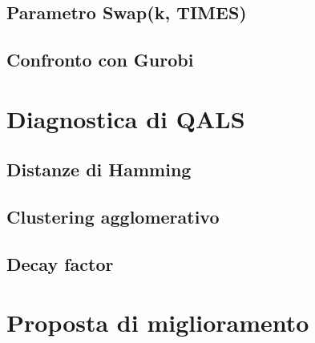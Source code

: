 \documentclass[12pt,a4paper,oneside]{report}
\begin{document}
\section{Parametro Swap(k, TIMES)}
\label{sec:swap-k-times}

\section{Confronto con Gurobi}
\label{sec:confronto-gurobi}

\chapter{Diagnostica di QALS}
\label{ch:diagnostica}

\section{Distanze di Hamming}
\label{sec:distanze-hamming}

\section{Clustering agglomerativo}
\label{sec:clustering}

\section{Decay factor}
\label{sec:decay-factor}

\chapter{Proposta di miglioramento}
\label{ch:proposta}
\end{document}
